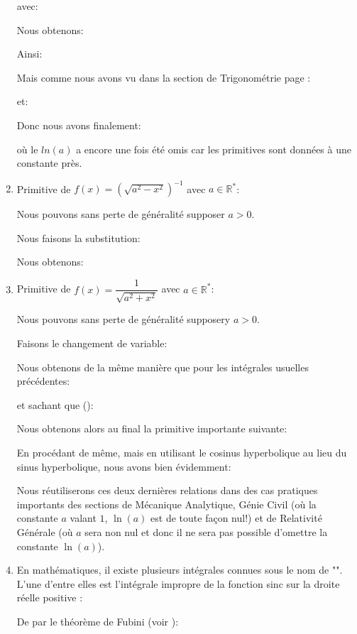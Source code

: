\begin{enumerate}
		avec:
		
		Nous obtenons:
		
		Ainsi:
		
		Mais comme nous avons vu dans la section de Trigonométrie page \pageref{hyperbolic trigonometry}:
		
		et:
		
		Donc nous avons finalement:
		
		où le $ln (a)$ a encore une fois été omis car les primitives sont données à une constante près.
		
		\item Primitive de $f(x)=\left(\sqrt{a^2-x^2}\right)^{-1}$ avec $a\in \mathbb{R}^*$:
		
		Nous pouvons sans perte de généralité supposer $a>0$.
		
		Nous faisons la substitution:
		
		Nous obtenons:
		
		
		\item Primitive de $f(x)=\dfrac{1}{\sqrt{a^2+x^2}}$ avec $a\in \mathbb{R}^*$:
		
		Nous pouvons sans perte de généralité supposery $a>0$.
		
		Faisons le changement de variable:
		
		Nous obtenons de la même manière que pour les intégrales usuelles précédentes:
		
		et sachant que ():
		
		Nous obtenons alors au final la primitive importante suivante:
		
		En procédant de même, mais en utilisant le cosinus hyperbolique au lieu du sinus hyperbolique, nous avons bien évidemment:
		
		Nous réutiliserons ces deux dernières relations dans des cas pratiques importants des sections de Mécanique Analytique, Génie Civil (où la constante $a$ valant $1$, $\ln(a)$ est de toute façon nul!) et de Relativité Générale (où $a$ sera non nul et donc il ne sera pas possible d'omettre la constante $\ln(a)$).
		
		\item En mathématiques, il existe plusieurs intégrales connues sous le nom de "\label{Dirichlet integral}". L'une d'entre elles est l'intégrale impropre de la fonction sinc sur la droite réelle positive :
	
	De par le théorème de Fubini (voir \pageref{fubini theorem}):
	

\end{enumerate}
